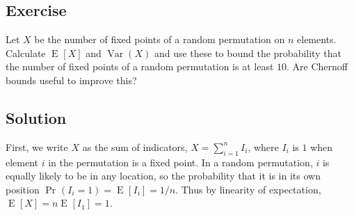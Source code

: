 \documentclass[14pt]{extreport}
\newcounter{counter}
\newcommand{\Exercise}{Exercise \stepcounter{counter}\thecounter}
\newcommand{\Var}[1]{\operatorname{Var}\left(#1\right)}
\newcommand{\E}[2][]{\operatorname{E}_{#1}\left[#2\right]}
\renewcommand{\Pr}[2][]{\operatorname{Pr}_{#1}\left(#2\right)}
\begin{document}
\begin{enumerate}
        
    \end{enumerate}

\subsection*{\Exercise}
    Let $X$ be the number of fixed points of a random permutation on $n$ elements. Calculate $\E{X}$ and $\Var{X}$ and use these to bound the probability that the number of fixed points of a random permutation is at least $10$. Are Chernoff bounds useful to improve this?

\subsection*{Solution}
    First, we write $X$ as the sum of indicators, $X = \sum_{i=1}^n I_i$, where $I_i$ is $1$ when element $i$ in the permutation is a fixed point. In a random permutation, $i$ is equally likely to be in any location, so the probability that it is in its own position $\Pr{I_i = 1} = \E{I_i} = 1/n$. Thus by linearity of expectation, $\E{X} = n\E{I_1} = 1$.
\end{document}
